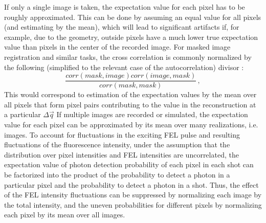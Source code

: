 If only a single image is taken, the expectation value for each pixel has to be roughly approximated. This can be done by assuming an equal value for all pixels (and estimating by the mean), which will lead to significant artifacts if, for example, due to the geometry, outside pixels have a much lower true expectation value than pixels in the center of the recorded image.  
For masked image registration and similar tasks, the cross correlation is commonly normalized by the following (simplified to the relevant case of the autocorrelation) divisor \cite{padfield2010}:
\begin{equation}
	\frac{\mathit{corr}(\mathit{mask},\mathit{image}) \mathit{corr}(\mathit{image},\mathit{mask})}{\mathit{corr}(\mathit{mask},\mathit{mask})} \,,
	\label{eq:normshot}
\end{equation} This would correspond to estimation of the expectation values by the mean over all pixels that form pixel pairs contributing to the value in the reconstruction at a particular $\Delta \vec{q}$
If multiple images are recorded or simulated, the expectation value for each pixel can be approximated by its mean over many realizations, i.e. images. To account for fluctuations in the exciting FEL pulse and resulting fluctuations of the fluorescence intensity, under the assumption that the distribution over pixel intensities and FEL intensities are uncorrelated, the expectation value of photon detection probability of each pixel in each shot can be factorized into the product of the probability to detect a photon in a particular pixel and the probability to detect a photon in a shot. Thus, the effect of the FEL intensity fluctuations can be suppressed by normalizing each image by the total intensity, and the uneven probabilities for different pixels by normalizing each pixel by its mean over all images. 



\clearpage
